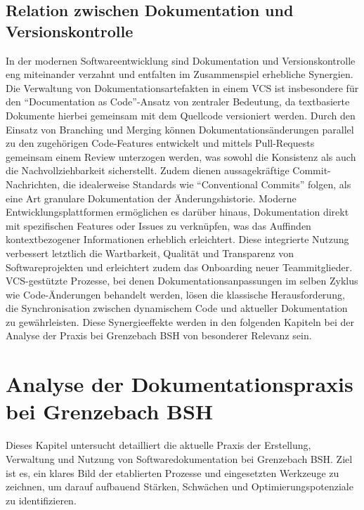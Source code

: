 \documentclass[12pt,oneside]{article}
\begin{document}
    \subsection{Relation zwischen Dokumentation und Versionskontrolle}
    \label{subsec:relation}
    In der modernen Softwareentwicklung sind Dokumentation und Versionskontrolle eng miteinander verzahnt und entfalten im Zusammenspiel erhebliche Synergien. Die Verwaltung von Dokumentationsartefakten in einem VCS ist insbesondere für den ``Documentation as Code''-Ansatz von zentraler Bedeutung, da textbasierte Dokumente hierbei gemeinsam mit dem Quellcode versioniert werden. Durch den Einsatz von Branching und Merging können Dokumentationsänderungen parallel zu den zugehörigen Code-Features entwickelt und mittels Pull-Requests gemeinsam einem Review unterzogen werden, was sowohl die Konsistenz als auch die Nachvollziehbarkeit sicherstellt.
    \newline
    Zudem dienen aussagekräftige Commit-Nachrichten, die idealerweise Standards wie ``Conventional Commits'' \cite{ConventionalCommitsOrgDe} folgen, als eine Art granulare Dokumentation der Änderungshistorie. Moderne Entwicklungsplattformen ermöglichen es darüber hinaus, Dokumentation direkt mit spezifischen Features oder Issues zu verknüpfen, was das Auffinden kontextbezogener Informationen erheblich erleichtert.
    \newline
    Diese integrierte Nutzung verbessert letztlich die Wartbarkeit, Qualität und Transparenz von Softwareprojekten und erleichtert zudem das Onboarding neuer Teammitglieder. VCS-gestützte Prozesse, bei denen Dokumentationsanpassungen im selben Zyklus wie Code-Änderungen behandelt werden, lösen die klassische Herausforderung, die Synchronisation zwischen dynamischem Code und aktueller Dokumentation zu gewährleisten. Diese Synergieeffekte werden in den folgenden Kapiteln bei der Analyse der Praxis bei Grenzebach BSH von besonderer Relevanz sein.



    \section{Analyse der Dokumentationspraxis bei Grenzebach BSH}
    \label{sec:analyse_dokumentation}
    Dieses Kapitel untersucht detailliert die aktuelle Praxis der Erstellung, Verwaltung und Nutzung von Softwaredokumentation bei Grenzebach BSH. Ziel ist es, ein klares Bild der etablierten Prozesse und eingesetzten Werkzeuge zu zeichnen, um darauf aufbauend Stärken, Schwächen und Optimierungspotenziale zu identifizieren.
\end{document}
